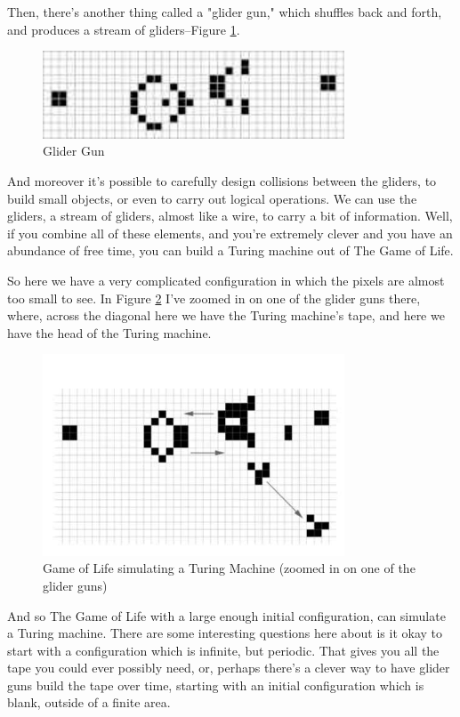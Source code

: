 \documentclass[]{article}
\begin{document}
Then, there's another thing called a "glider gun," which shuffles back and forth, and produces a stream of gliders--Figure \ref{fig:glider-gun}.

\begin{figure}[H]
	\begin{center}
		\caption[Glider Gun]{Glider Gun\cite{wiki:glider:gun}}\label{fig:glider-gun}
		\includegraphics[width=0.8\textwidth]{glider-gun}
	\end{center}
\end{figure}

And moreover it's possible to carefully design collisions between the gliders, to build small objects, or even to carry out logical operations. We can use the gliders, a stream of gliders, almost like a wire, to carry a bit of information. Well, if you combine all of these elements, and you're extremely clever and you have an abundance of free time, you can build a Turing machine out of The Game of Life.

So here we have a very complicated configuration in which the pixels are almost too small to see. In Figure \ref{fig:complicated-configuration} I've zoomed in on one of the glider guns there, where, across the diagonal here we have the Turing machine's tape, and here we have the head of the Turing machine.

\begin{figure}[H]
	\begin{center}
		\caption[Game of Life simulating a Turing Machine]{Game of Life simulating a Turing Machine (zoomed in on one of the glider guns)}\label{fig:complicated-configuration}
		\includegraphics[width=0.8\textwidth]{complicated-configuration}
	\end{center}
\end{figure}
And so The Game of Life
with a large enough initial configuration,
can simulate a Turing machine.
There are some interesting questions
here about is it okay
to start with a configuration
which is infinite, but periodic.
That gives you all the tape
you could ever possibly need,
or, perhaps there's a clever way
to have glider guns build the tape
over time, starting with
an initial configuration which is blank,
outside of a finite area.
\end{document}
